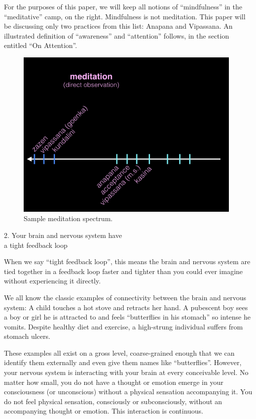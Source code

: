 \documentclass{article}
\begin{document}
For the purposes of this paper, we will keep all notions of ``mindfulness'' in the ``meditative'' camp, on the right. Mindfulness is not meditation. This paper will be discussing only two practices from this list: Anapana and Vipassana. An illustrated definition of ``awareness'' and ``attention'' follows, in the section entitled ``On Attention''.

\begin{figure}[H]
  \centering
  \includegraphics[width=11cm]{images/meditation-spectrum-3.jpeg}
  \caption{Sample meditation spectrum.}
  \label{fig:meditation-spectrum-3}
\end{figure}

\vspace{1cm}
\begin{center}
  \LARGE{2. Your brain and nervous system have}\\
  \LARGE{a tight feedback loop}
\end{center}

When we say ``tight feedback loop'', this means the brain and nervous system are tied together in a feedback loop faster and tighter than you could ever imagine without experiencing it directly.

We all know the classic examples of connectivity between the brain and nervous system: A child touches a hot stove and retracts her hand. A pubescent boy sees a boy or girl he is attracted to and feels ``butterflies in his stomach'' so intense he vomits. Despite healthy diet and exercise, a high-strung individual suffers from stomach ulcers.

These examples all exist on a gross level, coarse-grained enough that we can identify them externally and even give them names like ``butterflies''. However, your nervous system is interacting with your brain at every conceivable level. No matter how small, you do not have a thought or emotion emerge in your consciousness (or unconscious) without a physical sensation accompanying it. You do not feel physical sensation, consciously or subconsciously, without an accompanying thought or emotion. This interaction is continuous.
\end{document}
